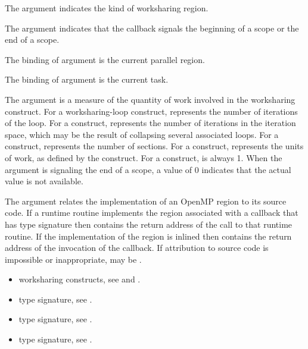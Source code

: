 \argdesc

The argument  indicates the kind of worksharing
region.

The  argument indicates that the callback signals
the beginning of a scope or the end of a scope.

The binding of argument  is the current
parallel region.

The binding of argument  is the current task.

The argument  is a measure of the quantity of work involved in the worksharing construct.
For a worksharing-loop construct,  represents the number of iterations of the loop.
For a  construct,  represents the number of iterations in the iteration space,
which may be the result of collapsing several associated loops.
For a  construct,  represents the number of sections.
For a  construct,  represents the units of work, as defined by the  construct.
For a  construct,  is always 1.
When the  argument is signaling the end of a scope, a  value of 0 indicates that the actual  value is not available.

The  argument relates the implementation of an OpenMP region
to its source code. If a runtime routine implements the region associated with
a callback that has type signature  then
 contains the return address of the call to that runtime routine.
If the implementation of the region is inlined then  contains the
return address of the invocation of the callback. If attribution to source code
is impossible or inappropriate, may be .


\crossreferences
\begin{itemize}
\item worksharing constructs, see  and .
\item {} type signature, see
.
\item {} type signature, see
.
\item {} type signature, see
.
\end{itemize}



